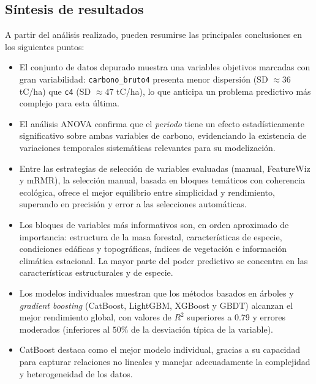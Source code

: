 \subsection{Síntesis de resultados}
\label{subsec:resultados_sintesis}

A partir del análisis realizado, pueden resumirse las principales conclusiones en los siguientes puntos:

\begin{itemize}
    \item El conjunto de datos depurado muestra una variables objetivos marcadas con gran variabilidad:
          \texttt{carbono\_bruto4} presenta menor dispersión (SD $\approx 36$ tC/ha)
          que \texttt{c4} (SD $\approx 47$ tC/ha), lo que anticipa un problema predictivo más complejo
          para esta última.

    \item El análisis ANOVA confirma que el \textit{periodo} tiene un efecto estadísticamente
          significativo sobre ambas variables de carbono, evidenciando la existencia de variaciones
          temporales sistemáticas relevantes para su modelización.

    \item Entre las estrategias de selección de variables evaluadas (manual, FeatureWiz y mRMR),
          la selección manual, basada en bloques temáticos con coherencia ecológica, ofrece el mejor
          equilibrio entre simplicidad y rendimiento, superando en precisión y error a las selecciones
          automáticas.

    \item Los bloques de variables más informativos son, en orden aproximado de importancia:
          estructura de la masa forestal, características de especie, condiciones edáficas y topográficas,
          índices de vegetación e información climática estacional. La mayor parte del poder predictivo se
          concentra en las características estructurales y de especie.

    \item Los modelos individuales muestran que los métodos basados en árboles y
          \textit{gradient boosting} (CatBoost, LightGBM, XGBoost y GBDT) alcanzan el mejor rendimiento
          global, con valores de $R^2$ superiores a 0.79 y errores moderados (inferiores al $50\%$ de
          la desviación típica de la variable).

    \item CatBoost destaca como el mejor modelo individual, gracias a su capacidad para capturar
          relaciones no lineales y manejar adecuadamente la complejidad y heterogeneidad de los datos.


\end{itemize}
